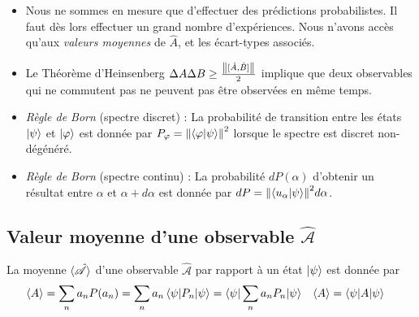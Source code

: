 \documentclass[../notesdecours.tex]{subfiles}
\begin{document}
\begin{center}
\end{center}
\begin{itemize}
\item Nous ne sommes en mesure que d'effectuer des prédictions probabilistes. Il faut dès lors effectuer un grand nombre d'expériences. Nous n'avons accès qu'aux \emph{valeurs moyennes} de $\hat{A}$, et les écart-types associés.
\item Le Théorème d'Heinsenberg $\Delta A\Delta B \geq \frac{\norm{{[\hat{A},\hat{B}]}}}{2}$ implique que deux observables qui ne commutent pas ne peuvent pas être observées en même temps.
\item \textit{Règle de Born} (spectre discret) : La probabilité de transition entre les états $\ket{\psi}$ et $\ket{\varphi}$ est donnée par $P_\varphi = \norm{\braket{\varphi|\psi}}^2$ lorsque le spectre est discret non-dégénéré.

\item \textit{Règle de Born} (spectre continu) : La probabilité $dP(\alpha)$ d'obtenir un résultat entre $\alpha$ et $\alpha+d\alpha$ est donnée par $dP = \norm{\braket{u_\alpha|\psi}}^2d\alpha$.
\end{itemize}

\subsection{Valeur moyenne d'une observable $\mathcal{\hat{A}}$}

\begin{definition}
	La moyenne $\braket{\hat{\mathcal{A}}}$ d'une observable $\mathcal{\hat{A}}$ par rapport à un état $\ket{\psi}$ est donnée par
	\begin{align}
		\braket{A} &= \sum_n a_n P(a_n) = \sum_n a_n \braket{\psi|P_n|\psi} = \braket{\psi|\sum_n a_n P_n | \psi} & \braket{A} &= \braket{\psi|A|\psi}
	\end{align}
\end{definition}
\end{document}
